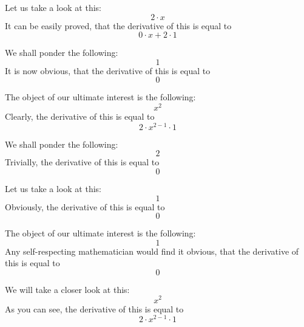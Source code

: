 \documentclass{article}
\begin{document}
Let us take a look at this:
\begin{equation}
2 \cdot x 
\end{equation}
It can be easily proved, that the derivative of this is equal to
\begin{equation}
0 \cdot x + 2 \cdot 1 
\end{equation}

We shall ponder the following:
\begin{equation}
1 
\end{equation}
It is now obvious, that the derivative of this is equal to
\begin{equation}
0 
\end{equation}

The object of our ultimate interest is the following:
\begin{equation}
x ^{2 } 
\end{equation}
Clearly, the derivative of this is equal to
\begin{equation}
2 \cdot x ^{2 - 1 } \cdot 1 
\end{equation}

We shall ponder the following:
\begin{equation}
2 
\end{equation}
Trivially, the derivative of this is equal to
\begin{equation}
0 
\end{equation}

Let us take a look at this:
\begin{equation}
1 
\end{equation}
Obviously, the derivative of this is equal to
\begin{equation}
0 
\end{equation}

The object of our ultimate interest is the following:
\begin{equation}
1 
\end{equation}
Any self-respecting mathematician would find it obvious, that the derivative of this is equal to
\begin{equation}
0 
\end{equation}

We will take a closer look at this:
\begin{equation}
x ^{2 } 
\end{equation}
As you can see, the derivative of this is equal to
\begin{equation}
2 \cdot x ^{2 - 1 } \cdot 1 
\end{equation}
\end{document}
